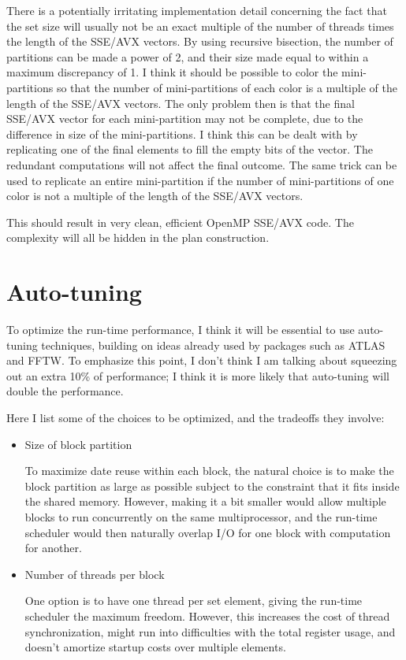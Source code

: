 \documentclass[12pt]{article}
\begin{document}
There is a potentially irritating implementation detail concerning the 
fact that the set size will usually not be an exact multiple of the number 
of threads times the length of the SSE/AVX vectors.  By using recursive 
bisection, the number of partitions can be made a power of 2, and their 
size made equal to within a maximum discrepancy of 1.  I think it should 
be possible to color the mini-partitions so that the number of 
mini-partitions of each color is a multiple of the length of the SSE/AVX 
vectors.  The only problem then is that the final SSE/AVX vector for
each mini-partition may not be complete, due to the difference in size of
the mini-partitions.  I think this can be dealt with by replicating one 
of the final elements to fill the empty bits of the vector.  The redundant 
computations will not affect the final outcome.  The same trick can be 
used to replicate an entire mini-partition if the number of mini-partitions 
of one color is not a multiple of the length of the SSE/AVX vectors. 

This should result in very clean, efficient OpenMP SSE/AVX code.  The 
complexity will all be hidden in the plan construction.

\newpage

\section{Auto-tuning}

To optimize the run-time performance, I think it will be essential 
to use auto-tuning techniques, building on ideas already used by 
packages such as ATLAS and FFTW.  To emphasize this point, I don't 
think I am talking about squeezing out an extra 10\% of performance; 
I think it is more likely that auto-tuning will double the performance.


Here I list some of the choices to be optimized, and the tradeoffs
they involve:
\begin{itemize}
\item
Size of block partition

To maximize date reuse within each block, the natural choice is 
to make the block partition as large as possible subject to the
constraint that it fits inside the shared memory.  However, 
making it a bit smaller would allow multiple blocks to run 
concurrently on the same multiprocessor, and the run-time 
scheduler would then naturally overlap I/O for one block
with computation for another.

\item
Number of threads per block

One option is to have one thread per set element, giving the 
run-time scheduler the maximum freedom.  However, this increases
the cost of thread synchronization, might run into difficulties 
with the total register usage, and doesn't amortize startup 
costs over multiple elements.

\end{itemize}
\end{document}
